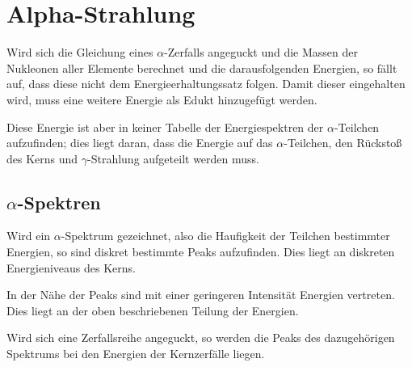 \documentclass{article}
\begin{document}
\section{Alpha-Strahlung}
Wird sich die Gleichung eines $\alpha$-Zerfalls angeguckt und die Massen der Nukleonen aller Elemente berechnet und die darausfolgenden Energien, so fällt auf, dass diese nicht dem Energieerhaltungssatz folgen. Damit dieser eingehalten wird, muss eine weitere Energie als Edukt hinzugefügt werden.
 
Diese Energie ist aber in keiner Tabelle der Energiespektren der $\alpha$-Teilchen aufzufinden; dies liegt daran, dass die Energie auf das $\alpha$-Teilchen, den Rückstoß des Kerns und $\gamma$-Strahlung aufgeteilt werden muss.
 
\subsection{$\alpha$-Spektren}
Wird ein $\alpha$-Spektrum gezeichnet, also die Haufigkeit der Teilchen bestimmter Energien, so sind diskret bestimmte Peaks aufzufinden. Dies liegt an diskreten Energieniveaus des Kerns.
 
In der Nähe der Peaks sind mit einer geringeren Intensität Energien vertreten. Dies liegt an der oben beschriebenen Teilung der Energien.
 
Wird sich eine Zerfallsreihe angeguckt, so werden die Peaks des dazugehörigen Spektrums bei den Energien der Kernzerfälle liegen. 
\end{document}
